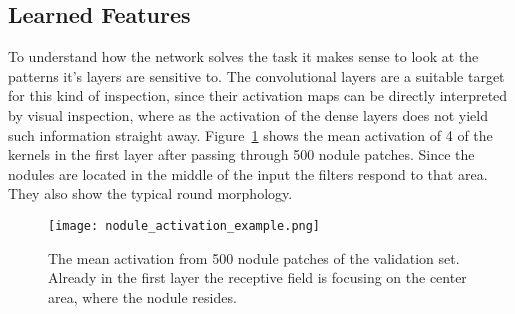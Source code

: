 \documentclass[main.tex]{subfiles}
\begin{document}
\subsection{Learned Features}
To understand how the network solves the task it makes sense to look at the patterns it's layers are sensitive to. The convolutional layers are a suitable target for this kind of inspection, since their activation maps can be directly interpreted by visual inspection, where as the activation of the dense layers does not yield such information straight away. Figure~\ref{fig:mean_activation} shows the mean activation of 4 of the kernels in the first layer after passing through 500 nodule patches. Since the nodules are located in the middle of the input the filters respond to that area. They also show the typical round morphology.


\begin{figure}
\begin{center}
\texttt{[image: nodule\_activation\_example.png]}
\end{center}
\caption{The mean activation from 500 nodule patches of the validation set. Already in the first layer the receptive field is focusing on the center area, where the nodule resides.}
\label{fig:mean_activation}
\end{figure}





\end{document}
